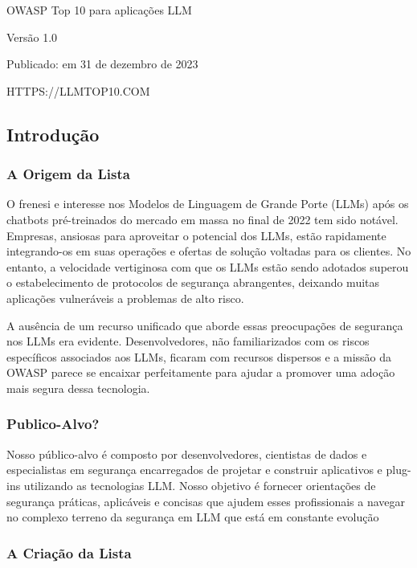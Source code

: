 \documentclass[
]{article}
\author{}
\date{}
\begin{document}
OWASP Top 10 para aplicações LLM

Versão 1.0

Publicado: em 31 de dezembro de 2023

HTTPS://LLMTOP10.COM

\subsection{Introdução}\label{introduuxe7uxe3o}

\subsubsection{A Origem da Lista}\label{a-origem-da-lista}

O frenesi e interesse nos Modelos de Linguagem de Grande Porte (LLMs)
após os chatbots pré-treinados do mercado em massa no final de 2022 tem
sido notável. Empresas, ansiosas para aproveitar o potencial dos LLMs,
estão rapidamente integrando-os em suas operações e ofertas de solução
voltadas para os clientes. No entanto, a velocidade vertiginosa com que
os LLMs estão sendo adotados superou o estabelecimento de protocolos de
segurança abrangentes, deixando muitas aplicações vulneráveis a
problemas de alto risco.

A ausência de um recurso unificado que aborde essas preocupações de
segurança nos LLMs era evidente. Desenvolvedores, não familiarizados com
os riscos específicos associados aos LLMs, ficaram com recursos
dispersos e a missão da OWASP parece se encaixar perfeitamente para
ajudar a promover uma adoção mais segura dessa tecnologia.

\subsubsection{Publico-Alvo?}\label{publico-alvo}

Nosso público-alvo é composto por desenvolvedores, cientistas de dados e
especialistas em segurança encarregados de projetar e construir
aplicativos e plug-ins utilizando as tecnologias LLM. Nosso objetivo é
fornecer orientações de segurança práticas, aplicáveis e concisas que
ajudem esses profissionais a navegar no complexo terreno da segurança em
LLM que está em constante evolução

\subsubsection{A Criação da Lista}\label{a-criauxe7uxe3o-da-lista}
\end{document}
